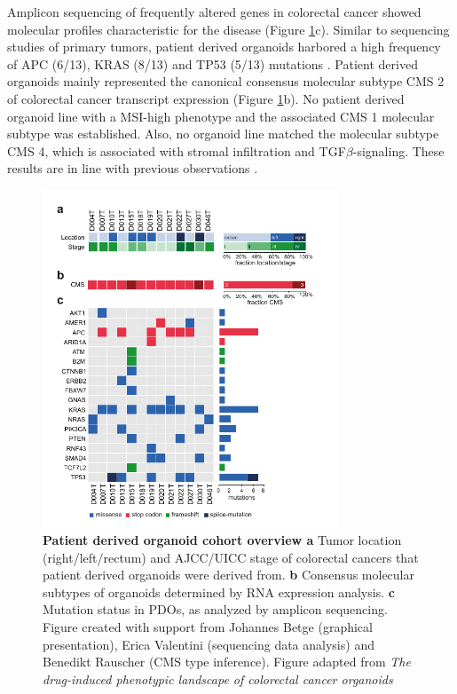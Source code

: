 \begin{flushleft}
\bigbreak
Amplicon sequencing of frequently altered genes in colorectal cancer showed molecular profiles characteristic for the disease (Figure \ref{fig_120}c). Similar to sequencing studies of primary tumors, patient derived organoids harbored a high frequency of APC (6/13), KRAS (8/13) and TP53 (5/13) mutations \citep{muznyComprehensiveMolecularCharacterization2012}. Patient derived organoids mainly represented the canonical consensus molecular subtype CMS 2 of colorectal cancer transcript expression \citep{guinneyConsensusMolecularSubtypes2015} (Figure \ref{fig_120}b). No patient derived organoid line with a MSI-high phenotype and the associated CMS 1 molecular subtype was established. Also, no organoid line matched the molecular subtype CMS 4, which is associated with stromal infiltration and TGF\(\beta\)-signaling. These results are in line with previous observations \citep{vandeweteringProspectiveDerivationLiving2015, schutteMolecularDissectionColorectal2017}.

\begin{figure}[!h]
\centering
\includegraphics[width=250pt,
                height=\textheight,
                keepaspectratio]{figures/promise/pdf/fig_1_0.pdf}
\caption[Patient derived organoid cohort overview]{\textbf{Patient derived organoid cohort overview a} Tumor location (right/left/rectum) and AJCC/UICC stage of colorectal cancers that patient derived organoids were derived from. \textbf{b}  Consensus molecular subtypes of organoids determined by RNA expression analysis. \textbf{c} Mutation status in PDOs, as analyzed by amplicon sequencing. Figure created with support from Johannes Betge (graphical presentation),  Erica Valentini (sequencing data analysis) and Benedikt Rauscher (CMS type inference). Figure adapted from \textit{The drug-induced phenotypic landscape of colorectal cancer organoids} \citep{betgeDruginducedPhenotypicLandscape2022}}
\label{fig_120}
\end{figure}



\end{flushleft}
